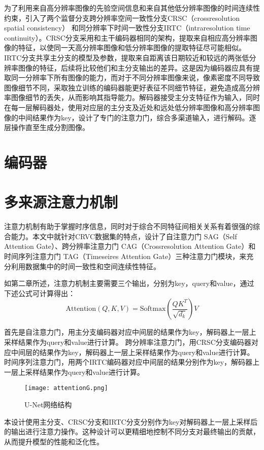 为了利用来自高分辨率图像的先验空间信息和来自其他低分辨率图像的时间连续性约束，引入了两个监督分支跨分辨率空间一致性分支CRSC（crossresolution spatial consistency） 和同分辨率下时间一致性分支IRTC（intraresolution time continuity）。CRSC分支采用和主干编码器相同的架构，提取来自相应高分辨率图像的特征，以使同一天高分辨率图像和低分辨率图像的提取特征尽可能相似。IRTC分支共享主分支的模型及参数，提取来自距离该日期较近和较远的两张低分辨率图像的特征，后续将比较他们和主分支输出的差异。这是因为编码器应具有提取同一分辨率下所有图像的能力，而对于不同分辨率图像来说，像素密度不同导致图像细节不同，采取独立训练的编码器能更好表征不同细节特征，避免造成高分辨率图像细节的丢失，从而影响其指导能力。解码器接受主分支特征作为输入，同时在每一层解码器处，使用对应层的主分支及近处和远处低分辨率图像和高分辨率图像的中间结果作为key，设计了专门的注意力门，综合多渠道输入，进行解码。逐层操作直至生成分割图像。
\section{编码器}

\section{多来源注意力机制}
注意力机制有助于掌握时序信息，同时对于综合不同特征间相关关系有着很强的综合能力。本文中就针对CRVC数据集的特点，设计了自注意力门 SAG（Self Attention Gate）、跨分辨率注意力门 CAG（Crossresolution Attention Gate）和时间序列注意力门 TAG（Timeseires Attention Gate）三种注意力门模块，来充分利用数据集中的时间一致性和空间连续性特征。

如第二章所述，注意力机制主要需要三个输出，分别为key，query和value，通过下述公式可计算得出：
\begin{equation}
\text{Attention}(Q, K, V) = \text{Softmax}\left(\frac{QK^T}{\sqrt{d_k}}\right)V 
\end{equation}

首先是自注意力门，用主分支编码器对应中间层的结果作为key，解码器上一层上采样结果作为query和value进行计算。
跨分辨率注意力门，用CRSC分支编码器对应中间层的结果作为key，解码器上一层上采样结果作为query和value进行计算。
时间序列注意力门，用两个IRTC编码器对应中间层的结果分别作为key，解码器上一层上采样结果作为query和value进行计算。
\begin{figure}[h]
    \centering
    \texttt{[image: attentionG.png]}
    \caption{U-Net网络结构}
    \label{fig:UNet}
  \end{figure}
本设计使用主分支、CRSC分支和IRTC分支分别作为key对解码器上一层上采样后的输出进行注意力操作。这种设计可以更精细地控制不同分支对最终输出的贡献，从而提升模型的性能和泛化性。

